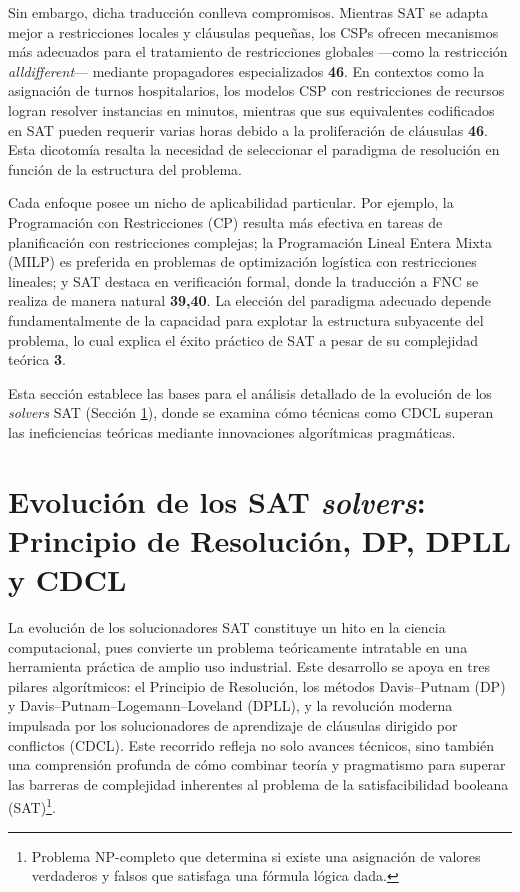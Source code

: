 Sin embargo, dicha traducción conlleva compromisos. Mientras SAT se adapta mejor a restricciones locales y cláusulas pequeñas, los CSPs ofrecen mecanismos más adecuados para el tratamiento de restricciones globales —como la restricción \textit{alldifferent}— mediante propagadores especializados \textbf{46}. En contextos como la asignación de turnos hospitalarios, los modelos CSP con restricciones de recursos logran resolver instancias en minutos, mientras que sus equivalentes codificados en SAT pueden requerir varias horas debido a la proliferación de cláusulas \textbf{46}. Esta dicotomía resalta la necesidad de seleccionar el paradigma de resolución en función de la estructura del problema.

Cada enfoque posee un nicho de aplicabilidad particular. Por ejemplo, la Programación con Restricciones (CP) resulta más efectiva en tareas de planificación con restricciones complejas; la Programación Lineal Entera Mixta (MILP) es preferida en problemas de optimización logística con restricciones lineales; y SAT destaca en verificación formal, donde la traducción a FNC se realiza de manera natural \textbf{39,40}. La elección del paradigma adecuado depende fundamentalmente de la capacidad para explotar la estructura subyacente del problema, lo cual explica el éxito práctico de SAT a pesar de su complejidad teórica \textbf{3}.


Esta sección establece las bases para el análisis detallado de la evolución de los \textit{solvers} SAT (Sección \ref{sec:evolucion-sat-solvers}), donde se examina cómo técnicas como CDCL superan las ineficiencias teóricas mediante innovaciones algorítmicas pragmáticas.

\section{Evolución de los SAT \textit{solvers}: Principio de Resolución, DP, DPLL y CDCL}
\label{sec:evolucion-sat-solvers}

La evolución de los solucionadores SAT constituye un hito en la ciencia computacional, pues convierte un problema teóricamente intratable en una herramienta práctica de amplio uso industrial. Este desarrollo se apoya en tres pilares algorítmicos: el Principio de Resolución, los métodos Davis–Putnam (DP) y Davis–Putnam–Logemann–Loveland (DPLL), y la revolución moderna impulsada por los solucionadores de aprendizaje de cláusulas dirigido por conflictos (CDCL). Este recorrido refleja no solo avances técnicos, sino también una comprensión profunda de cómo combinar teoría y pragmatismo para superar las barreras de complejidad inherentes al problema de la satisfacibilidad booleana (SAT)\footnote{Problema NP-completo que determina si existe una asignación de valores verdaderos y falsos que satisfaga una fórmula lógica dada.}.

